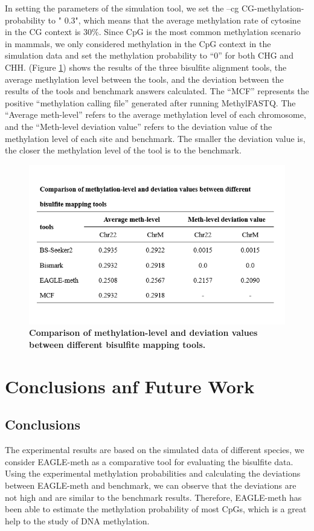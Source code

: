 \documentclass{PHlab-thesis}
\begin{document}
\par
In setting the parameters of the simulation tool, we set the --cg CG-methylation-probability to " 0.3", which means that the average methylation rate of cytosine in the CG context is 30\%. Since CpG is the most common methylation scenario in mammals, we only considered methylation in the CpG context in the simulation data and set the methylation probability to “0” for both CHG and CHH. (Figure \ref{f14}) shows the results of the three bisulfite alignment tools, the average methylation level between the tools, and the deviation between the results of the tools and benchmark answers calculated. The “MCF” represents the positive “methylation calling file” generated after running MethylFASTQ. The “Average meth-level” refers to the average methylation level of each chromosome, and the “Meth-level deviation value” refers to the deviation value of the methylation level of each site and benchmark. The smaller the deviation value is, the closer the methylation level of the tool is to the benchmark.

\begin{figure}[h]
  \centering
  \includegraphics[scale=0.8]{table/table7.png}
  \caption{\textbf{Comparison of methylation-level and deviation values between different bisulfite mapping tools.}}
  \label{f14}
\end{figure}


\chapter{Conclusions anf Future Work}

\section{Conclusions}
The experimental results are based on the simulated data of different species, we consider EAGLE-meth as a comparative tool for evaluating the bisulfite data. Using the experimental methylation probabilities and calculating the deviations between EAGLE-meth and benchmark, we can observe that the deviations are not high and are similar to the benchmark results. Therefore, EAGLE-meth has been able to estimate the methylation probability of most CpGs, which is a great help to the study of DNA methylation.
\end{document}
